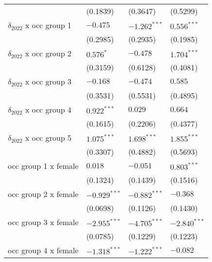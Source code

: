 \begin{tabular}{llll}
                                       &           (0.1839) &           (0.3647) &           (0.5299) \\
$\delta_{2022}$ x occ group 1          &           $-0.475$ &     $-1.262^{***}$ &      $0.556^{***}$ \\
                                       &           (0.2985) &           (0.2935) &           (0.1985) \\
$\delta_{2022}$ x occ group 2          &          $0.576^*$ &           $-0.478$ &      $1.704^{***}$ \\
                                       &           (0.3159) &           (0.6128) &           (0.4081) \\
$\delta_{2022}$ x occ group 3          &           $-0.168$ &           $-0.474$ &            $0.585$ \\
                                       &           (0.3531) &           (0.5531) &           (0.4895) \\
$\delta_{2022}$ x occ group 4          &      $0.922^{***}$ &            $0.029$ &            $0.664$ \\
                                       &           (0.1615) &           (0.2206) &           (0.4377) \\
$\delta_{2022}$ x occ group 5          &      $1.075^{***}$ &      $1.698^{***}$ &      $1.855^{***}$ \\
                                       &           (0.3307) &           (0.4882) &           (0.5693) \\
occ group 1 x female                   &            $0.018$ &           $-0.051$ &      $0.803^{***}$ \\
                                       &           (0.1324) &           (0.1439) &           (0.1516) \\
occ group 2 x female                   &     $-0.929^{***}$ &     $-0.882^{***}$ &           $-0.368$ \\
                                       &           (0.0698) &           (0.1126) &           (0.1430) \\
occ group 3 x female                   &     $-2.955^{***}$ &     $-4.705^{***}$ &     $-2.840^{***}$ \\
                                       &           (0.0785) &           (0.1229) &           (0.1223) \\
occ group 4 x female                   &     $-1.318^{***}$ &     $-1.222^{***}$ &           $-0.082$ \\

\end{tabular}

